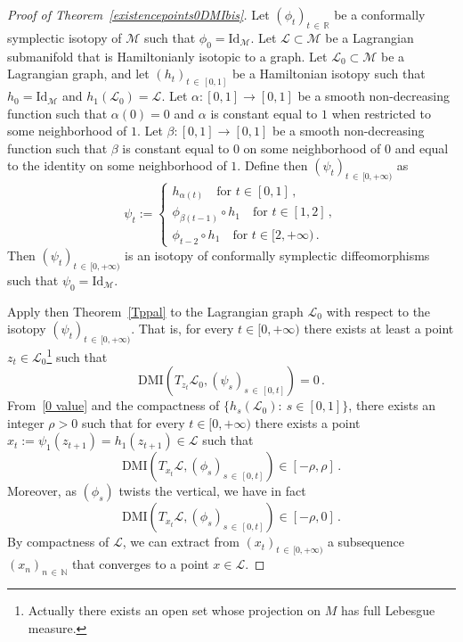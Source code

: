 \documentclass[AHL, Unicode, longabstracts, published]{cedram}
\newcommand*\M{\mathcal{M}}
\newcommand*\cl{\mathcal{L}}
\newcommand{\rId}{\mathrm{Id}}
\newcommand{\DMI}{\mathrm{DMI}}
\newcommand*\R{\mathbb{R}}
\newcommand*\N{\mathbb{N}}
\begin{document}
\begin{proof}[Proof of Theorem~\ref{existencepoints0DMIbis}]
Let $(\phi_t)_{t\,\in\,\R}$ be a conformally symplectic isotopy of $\M$ such that $\phi_0=\rId_\M$. Let $\cl\subset \M $ be a Lagrangian submanifold that is Hamiltonianly isotopic to a graph. Let $\cl_0\subset\M$ be a Lagrangian graph, and let $(h_t)_{t\,\in\,[0,1]}$ be a Hamiltonian isotopy such that $h_0=\rId_{\M}$ and $h_1(\cl_0)=\cl$. Let $\alpha:[0,1]\to[0,1]$ be a smooth non-decreasing function such that $\alpha(0)=0$ and $\alpha$ is constant equal to $1$ when restricted to some neighborhood of $1$. Let $\beta:[0,1]\to[0,1]$ be a smooth non-decreasing function such that $\beta$ is constant equal to $0$ on some neighborhood of $0$ and equal to the identity on some neighborhood of $1$. Define then $(\psi_t)_{t\,\in\,[0,+\infty)}$ as
\[
{\psi_t:=
\begin{cases}
h_{\alpha(t)}\quad \text{for }t\in\left[0,1\right]\,, \\
\phi_{\beta(t-1)}\circ h_1\quad\text{for }t\in[1,2]\,, \\
\phi_{t-2}\circ h_1\quad \text{for }t\in[2,+\infty)\,.
\end{cases}}
\]
Then $(\psi_t)_{t\,\in\,[0,+\infty)}$ is an isotopy of conformally symplectic diffeomorphisms such that $\psi_0=\rId_\M$.

Apply then Theorem~\ref{Tppal} to the Lagrangian graph $\cl_0$ with respect to the isotopy $(\psi_t)_{t\,\in\,[0,+\infty)}$. That is, for every $t\in[0,+\infty)$ there exists at least a point $z_t\in \cl_0$\footnote{Actually there exists an open set whose projection on $M$ has full Lebesgue measure.} such that
\begin{equation}\label{0 value}
\DMI\left(T_{z_t}\cl_0,(\psi_s)_{s\,\in\,[0,t]}\right)=0\,.
\end{equation}
From~\eqref{0 value} and the compactness of $\{ h_s(\cl_0) :\ s\in[0,1] \}$, there exists an integer $\rho>0$ such that for every $t\in[0,+\infty)$ there exists a point $x_t:=\psi_1(z_{t+1})=h_1(z_{t+1})\in \cl$ such that
\[
\DMI\left(T_{x_t}\cl,(\phi_s)_{s\,\in\,[0,t]}\right)\in[-\rho,\rho]\,.
\]
Moreover, as $(\phi_s)$ twists the vertical, we have in fact
\begin{equation}\label{choice of zt}
\DMI\left(T_{x_t}\cl,(\phi_s)_{s\,\in\,[0,t]}\right)\in[-\rho,0]\,.
\end{equation}
By compactness of $\cl$, we can extract from $(x_t)_{t\,\in\,[0,+\infty)}$ a subsequence $(x_n)_{n\,\in\,\N}$ that converges to a point $ x\in\cl$.


\end{proof}
\end{document}
